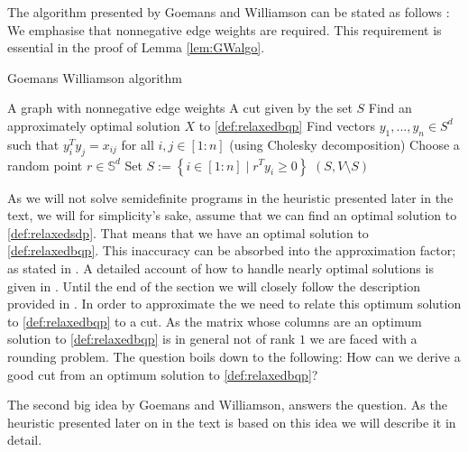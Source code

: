 \documentclass[12pt,a4paper]{article}
\theoremstyle{mythm}
\begin{document}
The algorithm presented by Goemans and Williamson can be stated as follows \cite[p.424]{Korte2018}:
We emphasise that nonnegative edge weights are required.
This requirement is essential in the proof of Lemma \ref{lem:GWalgo}.
\begin{algorithm}
\caption{Goemans Williamson algorithm}
\label{alg:GWalgo} 
\begin{algorithmic}[1]
\Require A graph with nonnegative edge weights
\Ensure A cut given by the set $ S $
\State Find an approximately optimal solution $ X $ to \ref{def:relaxedbqp} 
\State Find vectors $ y_1, ..., y_n \in S^d $ such that  $ y_i^Ty_j= x _{ ij }  $ for all $ i,j \in \left[ 1:n \right]  $ (using Cholesky decomposition)
\State Choose a random point $ r \in \mathbb{S} ^{ d } $
\State Set $ S := \left\{ i \in \left[ 1:n \right]  \mid r ^T y_i \geq 0  \right\}  $
\State \Return $ ( S , V \setminus S) $
\end{algorithmic}
\end{algorithm}

As we will not solve semidefinite programs in the heuristic presented later in the text, we will for simplicity's sake, assume that we can find an optimal solution to
\ref{def:relaxedsdp}.
That means that we have an optimal solution to \ref{def:relaxedbqp}. 
This inaccuracy can be absorbed into the approximation factor; as stated in \cite[p. 260]{Vazirani2003}. 
A detailed account of how to handle nearly optimal solutions is given in \cite{Korte2018}.
Until the end of the section we will closely follow the description provided in \cite[p. 260 ff]{Vazirani2003}.
In order to approximate the \MCP we need to relate this optimum solution to \ref{def:relaxedbqp} to a cut. 
As the matrix whose columns are an optimum solution to
\ref{def:relaxedbqp} is in general not of rank $ 1 $ we are faced with a rounding problem. 
The question boils down to the following: 
How can we derive a good cut from an optimum solution to \ref{def:relaxedbqp}?

The second big idea by Goemans and Williamson, answers the question.
As the heuristic presented later on in the text is based on this idea we will describe it in detail.
\end{document}
